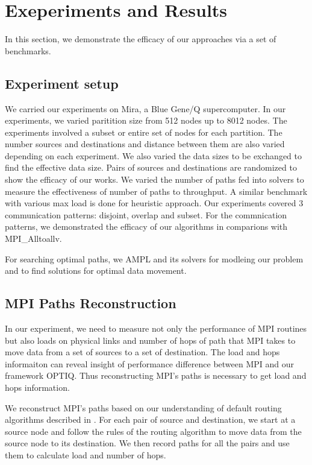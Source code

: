 \section{Exeperiments and Results}
\label{sec:benchmark}

In this section, we demonstrate the efficacy of our approaches via a set of benchmarks.

\subsection{Experiment setup}

We carried our experiments on Mira, a Blue Gene/Q supercomputer. In our experiments, we varied paritition size from 512 nodes up to 8012 nodes. The experiments involved a subset or entire set of nodes for each partition. The number sources and destinations and distance between them are also varied depending on each experiment. We also varied the data sizes to be exchanged to find the effective data size. Pairs of sources and destinations are randomized to show the efficacy of our works. We varied the number of paths fed into solvers to measure the effectiveness of number of paths to throughput. A similar benchmark with various max load is done for heuristic approach. Our experiments covered 3 communication patterns: disjoint, overlap and subset. For the commnication patterns, we demonstrated the efficacy of our algorithms in comparions with MPI\_Alltoallv.

For searching optimal paths, we AMPL and its solvers \cite{AMPL} for modleing our problem and to find solutions for optimal data movement.

\subsection{MPI Paths Reconstruction}

In our experiment, we need to measure not only the performance of MPI routines but also loads on physical links and number of hops of path that MPI takes to move data from a set of sources to a set of destination. The load and hops informaiton can reveal insight of performance difference between MPI and our framework OPTIQ. Thus reconstructing MPI's paths is necessary to get load and hops information.

We reconstruct MPI's paths based on our understanding of default routing algorithms described in \cite{Chen:BGQ}. For each pair of source and destination, we start at a source node and follow the rules of the routing algorithm to move data from the source node to its destination. We then record paths for all the pairs and use them to calculate load and number of hops. 

